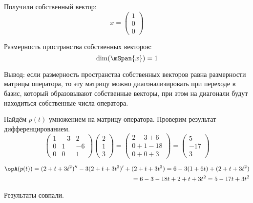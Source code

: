 Получили собственный вектор:
\[x = \begin{pmatrix} 1\\0\\0  \end{pmatrix}\]

Размерность пространства собственных векторов:
\[\dim(\mSpan\{x\}) = 1\]

Вывод: если размерность пространства собственных векторов
равна размерности матрицы оператора,
то эту матрицу можно диагонализировать при переходе в базис,
который образовывают собственные векторы,
при этом на диагонали будут находиться собственные числа оператора.

Найдём \(p(t)\) умножением на матрицу оператора.
Проверим результат дифференцированием.
\[
  \begin{pmatrix}
    1 & -3 & 2\\
    0 & 1 & -6\\
    0 & 0 & 1
  \end{pmatrix}
  \begin{pmatrix} 2\\ 1\\ 3 \end{pmatrix}
  =
  \begin{pmatrix}
      2 - 3 + 6 \\
      0 + 1 - 18 \\
      0 + 0 + 3
  \end{pmatrix}
  =
  \begin{pmatrix} 5 \\ -17 \\ 3 \end{pmatrix}
\]

\[
\begin{split}
  \opA(p(t))
  = (2 + t + 3t^2)^{\prime\prime}
  - 3(2 + t + 3t^2)^\prime
  + (2 + t + 3t^2)
  = 6 - 3(1 + 6t) + (2 + t + 3t^2) \\
  = 6 - 3 - 18t + 2 + t + 3t^2
  = 5 - 17t + 3t^2
\end{split}
\]

Результаты совпали.
